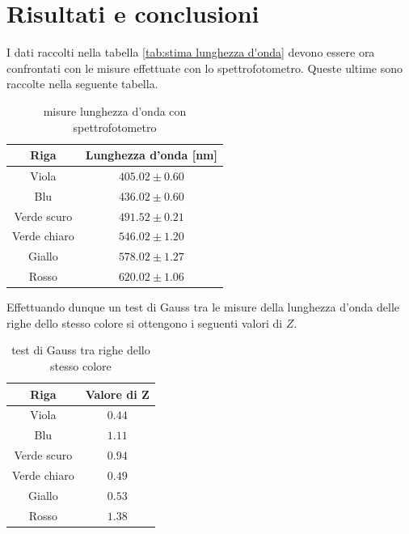 \documentclass{article}
\begin{document}
\section{Risultati e conclusioni}
I dati raccolti nella tabella \ref{tab:stima lunghezza d'onda} devono essere ora confrontati con le misure effettuate con lo spettrofotometro. Queste ultime sono raccolte nella seguente tabella.
\begin{table}[ht]
    \centering
    \begin{tabular}{|c|c|}
        \hline
        \textbf{Riga} & \textbf{Lunghezza d'onda [nm]} \\
        \hline
        Viola & $405.02\pm0.60$ \\
        \hline
        Blu & $436.02\pm0.60$ \\
        \hline
        Verde scuro & $491.52\pm0.21$ \\
        \hline
        Verde chiaro & $546.02\pm1.20$ \\
        \hline
        Giallo & $578.02\pm1.27$ \\
        \hline
        Rosso & $620.02\pm1.06$ \\
        \hline
    \end{tabular}
    \caption{misure lunghezza d'onda con spettrofotometro}
    \label{tab:misure spettrofotometro}
\end{table}

Effettuando dunque un test di Gauss tra le misure della lunghezza d'onda delle righe dello stesso colore si ottengono i seguenti valori di $Z$.
\begin{table}[ht]
    \centering
    \begin{tabular}{|c|c|}
        \hline
        \textbf{Riga} & \textbf{Valore di Z} \\
        \hline
        Viola & $0.44$ \\
        \hline
        Blu & $1.11$ \\
        \hline
        Verde scuro & $0.94$ \\
        \hline
        Verde chiaro & $0.49$ \\
        \hline
        Giallo & $0.53$ \\
        \hline
        Rosso & $1.38$ \\
        \hline
    \end{tabular}
    \caption{test di Gauss tra righe dello stesso colore}
    \label{tab:test di gauss lunghezze d'onda}
\end{table}
\end{document}
